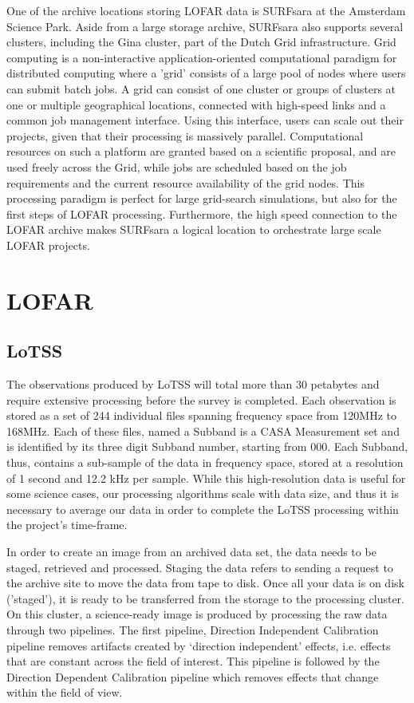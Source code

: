 One of the archive locations storing LOFAR data is SURFsara at the Amsterdam Science Park. Aside from a large storage archive, SURFsara also supports several clusters, including the Gina cluster, part of the Dutch Grid infrastructure. Grid computing is a non-interactive application-oriented computational paradigm for distributed computing where a 'grid' consists of a large pool of nodes where users can submit batch jobs. A grid can consist of one cluster or groups of clusters at one or multiple geographical locations, connected with high-speed links and a common job management interface. Using this interface, users can scale out their projects, given that their processing is massively parallel. Computational resources on such a platform are granted based on a scientific proposal, and are used freely across the Grid, while jobs are scheduled based on the job requirements and the current resource availability of the grid nodes. This processing paradigm is perfect for large grid-search simulations, but also for the first steps of LOFAR processing. Furthermore, the high speed connection to the LOFAR archive makes SURFsara a logical location to orchestrate large scale LOFAR projects.

\section{LOFAR}


\subsection{LoTSS}

The observations produced by LoTSS will total more than 30 petabytes and require extensive processing before the survey is completed. Each observation is stored as a set of 244 individual files spanning frequency space from 120MHz to 168MHz. Each of these files, named a Subband is a CASA Measurement set and is identified by its three digit Subband number, starting from 000. Each Subband, thus, contains a sub-sample of the data in frequency space, stored at a resolution of 1 second and 12.2 kHz per sample. While this high-resolution data is useful for some science cases, our processing algorithms scale with data size, and thus it is necessary to average our data in order to complete the LoTSS processing within the project's time-frame. 

In order to create an image from an archived data set, the data needs to be staged, retrieved and processed. Staging the data refers to sending a request to the archive site to move the data from tape to disk. Once all your data is on disk ('staged'), it is ready to be transferred from the storage to the processing cluster. On this cluster, a science-ready image is produced by processing the raw data through two pipelines. The first pipeline, Direction Independent Calibration pipeline removes artifacts created by `direction independent' effects, i.e. effects that are constant across the field of interest. This pipeline is followed by the Direction Dependent Calibration pipeline which removes effects that change within the field of view.
 
